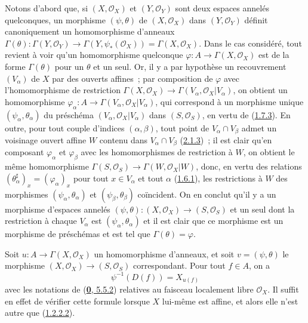 Notons d'abord que, si $(X,\mathscr{O}_X)$ et $(Y,\mathscr{O}_Y)$ sont deux
espaces annelés quelconques, un morphisme $(\psi,\theta)$ de
$(X,\mathscr{O}_X)$ dans $(Y,\mathscr{O}_Y)$ définit canoniquement un
homomorphisme d'anneaux
$\Gamma(\theta):\Gamma(Y,\mathscr{O}_Y)\to
\Gamma(Y,\psi_*(\mathscr{O}_X))=\Gamma(X,\mathscr{O}_X)$. Dans le cas
considéré, tout revient à voir qu'un homomorphisme quelconque
$\varphi:A\to\Gamma(X,\mathscr{O}_X)$ est de la forme $\Gamma(\theta)$ pour
un $\theta$ et un seul. Or, il y a par hypothèse un recouvrement $(V_\alpha)$
de $X$ par des ouverts affines~; par composition de $\varphi$ avec
l'homomorphisme de restriction
$\Gamma(X,\mathscr{O}_X)\to
\Gamma(V_\alpha,\mathscr{O}_X|V_\alpha)$, on obtient un homomorphisme
$\varphi_\alpha:A\to\Gamma(V_\alpha,\mathscr{O}_X|V_\alpha)$, qui correspond
à un morphisme unique $(\psi_\alpha,\theta_\alpha)$ du préschéma
$(V_\alpha,\mathscr{O}_X|V_\alpha)$ dans $(S,\mathscr{O}_S)$, en vertu de
(\hyperref[I.1.7.3-fr]{1.7.3}). En outre, pour tout couple d'indices
$(\alpha,\beta)$, tout point de $V_\alpha\cap V_\beta$ admet un voisinage
ouvert affine $W$ contenu dans $V_\alpha\cap V_\beta$
(\hyperref[I.2.1.3-fr]{2.1.3})~; il est clair qu'en composant $\varphi_\alpha$
et $\varphi_\beta$ avec les homomorphismes de restriction à $W$, on obtient
le même homomorphisme
$\Gamma(S,\mathscr{O}_S)\to\Gamma(W,\mathscr{O}_X|W)$, donc, en vertu des
relations $(\theta_\alpha^\sharp)_x=(\varphi_\alpha)_x$ pour tout
$x\in V_\alpha$ et tout $\alpha$ (\hyperref[I.1.6.1-fr]{1.6.1}), les
restrictions à $W$ des morphismes $(\psi_\alpha,\theta_\alpha)$ et
$(\psi_\beta,\theta_\beta)$ coïncident. On en conclut qu'il y a un morphisme
d'espaces annelés
$(\psi,\theta):(X,\mathscr{O}_X)\to(S,\mathscr{O}_S)$ et un seul dont la
restriction à chaque $V_\alpha$ est $(\psi_\alpha,\theta_\alpha)$ et il est
clair que ce morphisme est un morphisme de préschémas et est tel que
$\Gamma(\theta)=\varphi$.

Soit $u:A\to\Gamma(X,\mathscr{O}_X)$ un homomorphisme d'anneaux, et soit
$v=(\psi,\theta)$ le morphisme $(X,\mathscr{O}_X)\to(S,\mathscr{O}_S)$
correspondant. Pour tout $f\in A$, on a
\begin{equation}
  \psi^{-1}(D(f))=X_{u(f)}
  \tag{2.2.4.1}\label{I.2.2.4.1-fr}
\end{equation}
avec les notations de (\hyperref[0.5.5.2-fr]{\textbf{0}, 5.5.2}) relatives au faisceau
localement libre $\mathscr{O}_X$. Il suffit en effet de vérifier cette formule
lorsque $X$ lui-même est affine, et alors elle n'est autre que
(\hyperref[I.1.2.2.2-fr]{1.2.2.2}).

